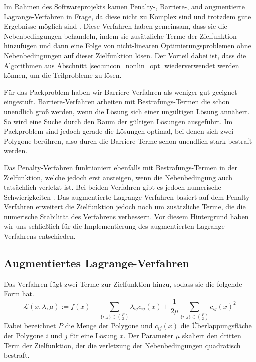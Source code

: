 \documentclass[runningheads,a4paper]{llncs}
\begin{document}
Im Rahmen des Softwareprojekts kamen Penalty-, Barriere-, and augmentierte Lagrange-Verfahren in Frage, da diese nicht zu Komplex sind und trotzdem gute Ergebnisse möglich sind \cite{nocedal1999numerical}. Diese Verfahren haben gemeinsam, dass sie die Nebenbedingungen behandeln, indem sie zusätzliche Terme der Zielfunktion hinzufügen und dann eine Folge von nicht-linearen Optimierungsproblemen ohne Nebenbedingungen auf dieser Zielfunktion lösen. Der Vorteil dabei ist, dass die Algorithmen aus Abschnitt \ref{sec:uncon_nonlin_opt} wiederverwendet werden können, um die Teilprobleme zu lösen.

Für das Packproblem haben wir Barriere-Verfahren als weniger gut geeignet eingestuft. Barriere-Verfahren arbeiten mit Bestrafungs-Termen die schon unendlich groß werden, wenn die Lösung sich einer ungültigen Lösung annähert. So wird eine Suche durch den Raum der gültigen Lösungen ausgeführt. Im Packproblem sind jedoch gerade die Lösungen optimal, bei denen sich zwei Polygone berühren, also durch die Barriere-Terme schon unendlich stark bestraft werden.

Das Penalty-Verfahren funktioniert ebenfalls mit Bestrafungs-Termen in der Zielfunktion, welche jedoch erst ansteigen, wenn die Nebenbedingung auch tatsächlich verletzt ist. Bei beiden Verfahren gibt es jedoch numerische Schwierigkeiten \cite{nocedal1999numerical}. Das augmentierte Lagrange-Verfahren basiert auf dem Penalty-Verfahren erweitert die Zielfunktion jedoch noch um zusätzliche Terme, die die numerische Stabilität des Verfahrens verbessern. Vor diesem Hintergrund haben wir uns schließlich für die Implementierung des augmentierten Lagrange-Verfahrens entschieden.

\subsection{Augmentiertes Lagrange-Verfahren}
Das Verfahren fügt zwei Terme zur Zielfunktion hinzu, sodass sie die folgende Form hat.
\begin{equation}
\label{eq:aug_lagrangian}
\mathcal{L}(x,\lambda,\mu) := f(x) - \sum_{\{i,j\}\in {P \choose 2}} \lambda_{ij} c_{ij}(x) + \frac{1}{2\mu}\sum_{\{i,j\}\in {P \choose 2}} c_{ij}(x)^2
\end{equation}
Dabei bezeichnet $P$ die Menge der Polygone und $c_{ij}(x)$ die Überlappungsfläche der Polygone $i$ und $j$ für eine Lösung $x$. Der Parameter $\mu$ skaliert den dritten Term der Zielfunktion, der die verletzung der Nebenbedingungen quadratisch bestraft.
\end{document}
